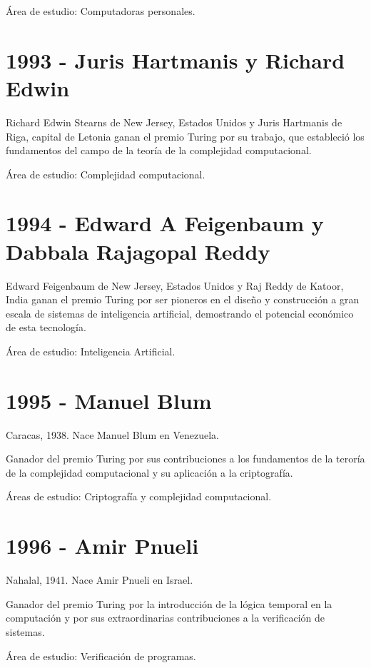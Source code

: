 \documentclass[a4paper, 11pt]{article}
\begin{document}
\noindent Área de estudio: Computadoras personales.
\newline

\section*{1993 - Juris Hartmanis y Richard Edwin}
\noindent Richard Edwin Stearns de New Jersey, Estados Unidos y Juris Hartmanis de Riga, capital de Letonia ganan el premio Turing por su trabajo, que estableció los fundamentos del campo de la teoría de la complejidad computacional.

\noindent Área de estudio: Complejidad computacional.
\newline


\section*{1994 - Edward A Feigenbaum y Dabbala Rajagopal Reddy}
\noindent Edward Feigenbaum de New Jersey, Estados Unidos y Raj Reddy de Katoor, India ganan el premio Turing por ser pioneros en el diseño y construcción a gran escala de sistemas de inteligencia artificial, demostrando el potencial económico de esta tecnología.

\noindent Área de estudio: Inteligencia Artificial.
\newline

\section*{1995 - Manuel Blum}
\noindent Caracas, 1938. Nace Manuel Blum en Venezuela.

\noindent Ganador del premio Turing por sus contribuciones a los fundamentos de la teroría de la complejidad computacional y su aplicación a la criptografía.

\noindent Áreas de estudio: Criptografía y complejidad computacional.
\newline

\section*{1996 - Amir Pnueli}
\noindent Nahalal, 1941. Nace Amir Pnueli en Israel.

\noindent Ganador del premio Turing por la introducción de la lógica temporal en la computación y por sus extraordinarias contribuciones a la verificación de sistemas.

\noindent Área de estudio: Verificación de programas. 
\newline
\end{document}
